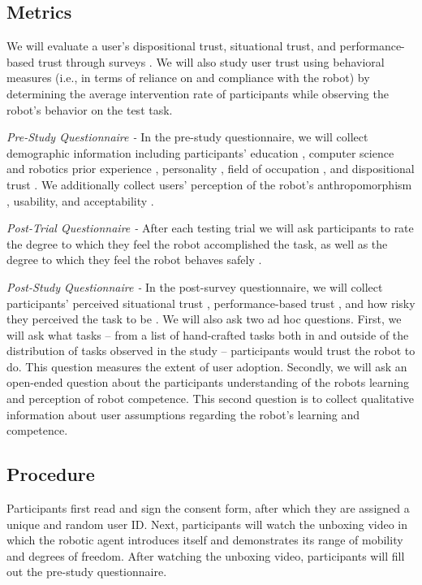 \documentclass[letterpaper]{article} %
\begin{document}
\subsection{Metrics}
\label{sec:metrics}
We will evaluate a user's dispositional trust, situational trust, and performance-based trust through surveys \cite{merritt_i_2013, jian_foundations_2000, malle_multidimensional_2021}. We will also study user trust using behavioral measures (i.e., in terms of reliance on and compliance with the robot) by determining the average intervention rate of participants while observing the robot's behavior on the test task.

\textit{Pre-Study Questionnaire -} In the pre-study questionnaire, we will collect demographic information including participants' education \cite{raub_correlates_nodate}, computer science and robotics prior experience \cite{raub_correlates_nodate}, personality \cite{donnellan_mini-ipip_2006}, field of occupation \cite{noauthor_college_nodate}, and dispositional trust \cite{merritt_i_2013}. We additionally collect users' perception of the robot's anthropomorphism \cite{bartneck_measurement_2009}, usability, and acceptability \cite{belanche_integrating_2012}.

\textit{Post-Trial Questionnaire -}
After each testing trial we will ask participants to rate the degree to which they feel the robot accomplished the task, as well as the degree to which they feel the robot behaves safely \cite{bartneck_measurement_2009}.

\textit{Post-Study Questionnaire -}
In the post-survey questionnaire, we will collect participants' perceived situational trust \cite{jian_foundations_2000}, performance-based trust \cite{malle_multidimensional_2021}, and how risky they perceived the task to be \cite{fischhoff_how_1978}. We will also ask two ad hoc questions. First, we will ask what tasks -- from a list of hand-crafted tasks both in and outside of the distribution of tasks observed in the study -- participants would trust the robot to do. This question measures the extent of user adoption. Secondly, we will ask an open-ended question about the participants understanding of the robots learning and perception of robot competence. This second question is to collect qualitative information about user assumptions regarding the robot's learning and competence.

\subsection{Procedure}
\label{sec:procedure}
Participants first read and sign the consent form, after which they are assigned a unique and random user ID. Next, participants will watch the unboxing video in which the robotic agent introduces itself and demonstrates its range of mobility and degrees of freedom. After watching the unboxing video, participants will fill out the pre-study questionnaire. 
\end{document}
